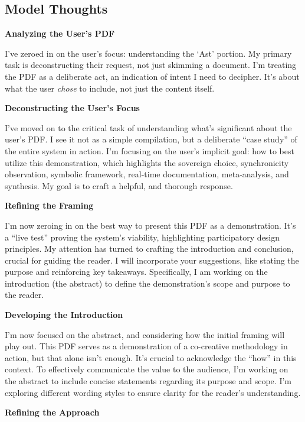 \documentclass{article}
\begin{document}
\subsection*{Model Thoughts}\label{model-thoughts}

\textbf{Analyzing the User's PDF}

I've zeroed in on the user's focus: understanding the `Ast' portion. My
primary task is deconstructing their request, not just skimming a
document. I'm treating the PDF as a deliberate act, an indication of
intent I need to decipher. It's about what the user \emph{chose} to
include, not just the content itself.

\textbf{Deconstructing the User's Focus}

I've moved on to the critical task of understanding what's significant
about the user's PDF. I see it not as a simple compilation, but a
deliberate ``case study'' of the entire system in action. I'm focusing
on the user's implicit goal: how to best utilize this demonstration,
which highlights the sovereign choice, synchronicity observation,
symbolic framework, real-time documentation, meta-analysis, and
synthesis. My goal is to craft a helpful, and thorough response.

\textbf{Refining the Framing}

I'm now zeroing in on the best way to present this PDF as a
demonstration. It's a ``live test'' proving the system's viability,
highlighting participatory design principles. My attention has turned to
crafting the introduction and conclusion, crucial for guiding the
reader. I will incorporate your suggestions, like stating the purpose
and reinforcing key takeaways. Specifically, I am working on the
introduction (the abstract) to define the demonstration's scope and
purpose to the reader.

\textbf{Developing the Introduction}

I'm now focused on the abstract, and considering how the initial framing
will play out. This PDF serves as a demonstration of a co-creative
methodology in action, but that alone isn't enough. It's crucial to
acknowledge the ``how'' in this context. To effectively communicate the
value to the audience, I'm working on the abstract to include concise
statements regarding its purpose and scope. I'm exploring different
wording styles to ensure clarity for the reader's understanding.

\textbf{Refining the Approach}
\end{document}

